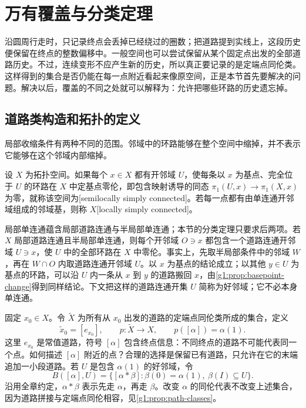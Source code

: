 
% 
% 

\section{万有覆盖与分类定理}
\label{g1:sec:0504}

沿圆周行走时，只记录终点会丢掉已经绕过的圈数；把道路提到实线上，这段历史便保留在终点的整数偏移中。一般空间也可以尝试保留从某个固定点出发的全部道路历史。不过，连续变形不应产生新的历史，所以真正要记录的是定端点同伦类。这样得到的集合是否仍能在每一点附近看起来像原空间，正是本节首先要解决的问题。解决以后，覆盖的不同之处就可以解释为：允许把哪些环路的历史遗忘掉。

\subsection{道路类构造和拓扑的定义}
\label{g1:subsec:0504:01}

局部收缩条件有两种不同的范围。邻域中的环路能够在整个空间中缩掉，并不表示它能够在这个邻域内部缩掉。

\begin{definition}\label{g1:def:semilocally-simply-connected}
	设 \(X\) 为拓扑空间。如果每个 \(x\in X\) 都有开邻域 \(U\)，使每条以 \(x\) 为基点、完全位于 \(U\) 的环路在 \(X\) 中定基点零伦，即包含映射诱导的同态 \(\pi_1(U,x)\to\pi_1(X,x)\) 为零，就称该空间为[semilocally simply connected]。若每一点都有由单连通开邻域组成的邻域基，则称 \(X\)[locally simply connected]。
\end{definition}

局部单连通蕴含局部道路连通与半局部单连通；本节的分类定理只要求后两项。若 \(X\) 局部道路连通且半局部单连通，则每个开邻域 \(O\ni x\) 都包含一个道路连通开邻域 \(U\ni x\)，使 \(U\) 中的全部环路在 \(X\) 中零伦。事实上，先取半局部条件中的邻域 \(W\)，再在 \(W\cap O\) 内取道路连通开邻域 \(U\)。以 \(x\) 为基点的结论成立；以其他 \(y\in U\) 为基点的环路，可以沿 \(U\) 内一条从 \(x\) 到 \(y\) 的道路搬回 \(x\)，由\cref{g1:prop:basepoint-change}得到同样结论。下文把这样的道路连通开集 \(U\) 简称为好邻域；它不必本身单连通。

固定 \(x_0\in X\)。令 \(\widetilde X\) 为所有从 \(x_0\) 出发的道路的定端点同伦类所成的集合，定义
\[
	\widetilde x_0=[e_{x_0}],\qquad p:\widetilde X\longrightarrow X,\qquad p([\alpha])=\alpha(1).
\]
这里 \(e_{x_0}\) 是常值道路，符号 \([\alpha]\) 包含终点信息：不同终点的道路不可能代表同一个点。如何描述 \([\alpha]\) 附近的点？合理的选择是保留已有道路，只允许在它的末端追加一小段道路。若 \(U\) 是包含 \(\alpha(1)\) 的好邻域，令
\[
	B([\alpha],U)=\{[\alpha*\beta]:\beta(0)=\alpha(1),\ \beta(I)\subseteq U\}.
\]
沿用全章约定，\(\alpha*\beta\) 表示先走 \(\alpha\)，再走 \(\beta\)。改变 \(\alpha\) 的同伦代表不改变上述集合，因为道路拼接与定端点同伦相容，见\cref{g1:prop:path-classes}。

